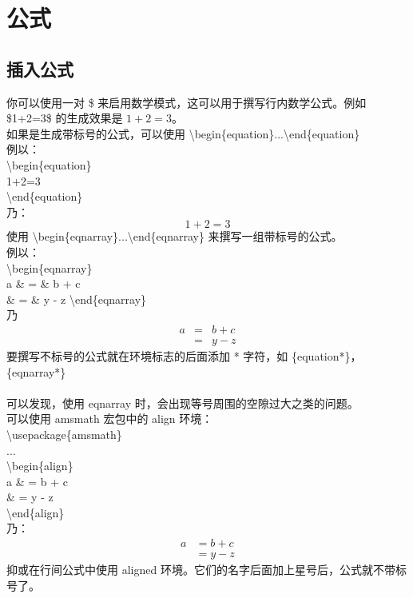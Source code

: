 \documentclass{article}
\begin{document}
\section{公式}
\subsection{插入公式}
你可以使用一对 \$ 来启用数学模式，这可以用于撰写行内数学公式。例如 \$1+2=3\$ 的生成效果是 $1+2=3$。\\
如果是生成带标号的公式，可以使用 \textbackslash begin\{equation\}...\textbackslash end\{equation\}\\
例以：\\
\textbackslash begin\{equation\}\\
  1+2=3\\
\textbackslash end\{equation\}\\
乃：\\
\begin{equation}
  1+2=3
\end{equation}
使用 \textbackslash begin\{eqnarray\}...\textbackslash end\{eqnarray\} 来撰写一组带标号的公式。\\
例以：\\
\textbackslash begin\{eqnarray\}\\
  a \& = \& b + c \\
  \& = \& y - z
\textbackslash end\{eqnarray\}\\
乃\\
\begin{eqnarray}
  a & = & b + c \\
  & = & y - z
\end{eqnarray}
要撰写不标号的公式就在环境标志的后面添加 * 字符，如 \{equation*\}，\{eqnarray*\}\\
\\
可以发现，使用 eqnarray 时，会出现等号周围的空隙过大之类的问题。\\
可以使用 amsmath 宏包中的 align 环境：\\
\textbackslash usepackage\{amsmath\}\\
...\\
\textbackslash begin\{align\}\\
  a \& = b + c \\
    \& = y - z\\
\textbackslash end\{align\}\\
乃：\\
\begin{align}
  a & = b + c \\
    & = y - z
\end{align}
抑或在行间公式中使用 aligned 环境。它们的名字后面加上星号后，公式就不带标号了。
\end{document}
